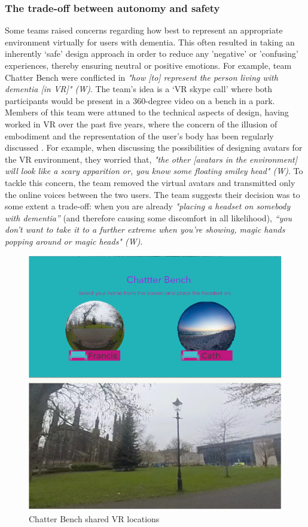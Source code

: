 \subsubsection{The trade-off between autonomy and safety}
\label{ThemeTwo:subthemeTwo}
Some teams raised concerns regarding how best to represent an appropriate environment virtually for users with dementia. This often resulted in taking an inherently ‘safe’ design approach in order to reduce any 'negative' or 'confusing' experiences, thereby ensuring neutral or positive emotions. For example, team Chatter Bench were conflicted in \textit{"how [to] represent the person living with dementia [in VR]" (W)}. The team's idea is a ‘VR skype call' where both participants would be present in a 360-degree video on a bench in a park. Members of this team were attuned to the technical aspects of design, having worked in VR over the past five years, where the concern of the illusion of embodiment and the representation of the user's body has been regularly discussed \citep{nakamura_virtual_2019}. For example, when discussing the possibilities of designing avatars for the VR environment, they worried that, \textit{"the other [avatars in the environment] will look like a scary apparition or, you know some floating smiley head" (W)}. To tackle this concern, the team removed the virtual avatars and transmitted only the online voices between the two users. The team suggests their decision was to some extent a trade-off: when you are already \textit{"placing a headset on somebody with dementia”} (and therefore causing some discomfort in all likelihood), \textit{“you don't want to take it to a further extreme when you're showing, magic hands popping around or magic heads" (W)}. 

\begin{figure}[htp]
\centering
\includegraphics[width=.8\linewidth]{Images/DemVR/Findings/ChatterBench.png}
\caption{Chatter Bench shared VR locations}
\label{fig:ChatterBenchDemo}
\end{figure}

